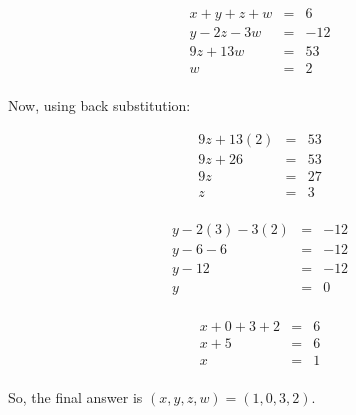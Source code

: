 \documentclass[letterpaper, 12pt]{article}
\begin{document}
\begin{eqnarray*}
x+y+z+w &=& 6 \\
y-2z-3w &=& -12 \\
9z+13w &=& 53 \\
w &=& 2 \\
\end{eqnarray*}

Now, using back substitution:

\begin{eqnarray*}
9z+13(2) &=& 53 \\
9z+26 &=& 53 \\
9z &=& 27 \\
z &=& 3 \\
\end{eqnarray*}

\begin{eqnarray*}
y-2(3)-3(2) &=& -12 \\
y-6-6 &=& -12 \\
y-12 &=& -12 \\
y &=& 0 \\
\end{eqnarray*}

\begin{eqnarray*}
x+0+3+2 &=& 6 \\
x+5 &=& 6 \\
x &=& 1 \\
\end{eqnarray*}

So, the final answer is $(x,y,z,w)=(1,0,3,2)$.
\end{document}
